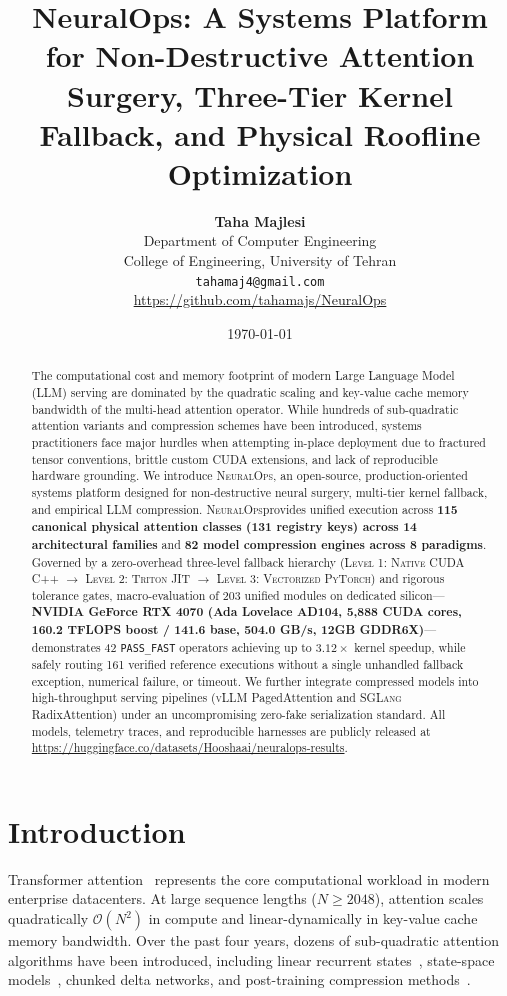 \documentclass{article}
\title{\textbf{NeuralOps: A Systems Platform for Non-Destructive Attention Surgery, Three-Tier Kernel Fallback, and Physical Roofline Optimization}}
\author{
  \textbf{Taha Majlesi} \\
  Department of Computer Engineering \\
  College of Engineering, University of Tehran \\
  \texttt{tahamaj4@gmail.com} \\
  \url{https://github.com/tahamajs/NeuralOps}
}
\date{\today}
\newcommand{\systemname}{\textsc{NeuralOps}}
\newcommand{\passfast}{\texttt{PASS\_FAST}}
\begin{document}
\maketitle

\begin{abstract}
The computational cost and memory footprint of modern Large Language Model (LLM) serving are dominated by the quadratic scaling and key-value cache memory bandwidth of the multi-head attention operator. While hundreds of sub-quadratic attention variants and compression schemes have been introduced, systems practitioners face major hurdles when attempting in-place deployment due to fractured tensor conventions, brittle custom CUDA extensions, and lack of reproducible hardware grounding. We introduce \systemname, an open-source, production-oriented systems platform designed for non-destructive neural surgery, multi-tier kernel fallback, and empirical LLM compression. \systemname provides unified execution across \textbf{115 canonical physical attention classes (131 registry keys) across 14 architectural families} and \textbf{82 model compression engines across 8 paradigms}. Governed by a zero-overhead three-level fallback hierarchy (\textsc{Level 1: Native CUDA C++} $\to$ \textsc{Level 2: Triton JIT} $\to$ \textsc{Level 3: Vectorized PyTorch}) and rigorous tolerance gates, macro-evaluation of 203 unified modules on dedicated silicon---\textbf{NVIDIA GeForce RTX 4070 (Ada Lovelace AD104, 5,888 CUDA cores, 160.2 TFLOPS boost / 141.6 base, 504.0 GB/s, 12GB GDDR6X)}---demonstrates 42 \passfast{} operators achieving up to $3.12\times$ kernel speedup, while safely routing 161 verified reference executions without a single unhandled fallback exception, numerical failure, or timeout. We further integrate compressed models into high-throughput serving pipelines (\textsc{vLLM} PagedAttention and \textsc{SGLang} RadixAttention) under an uncompromising zero-fake serialization standard. All models, telemetry traces, and reproducible harnesses are publicly released at \url{https://huggingface.co/datasets/Hooshaai/neuralops-results}.
\end{abstract}

\section{Introduction}
\label{sec:introduction}
Transformer attention~\citep{vaswani2017attention} represents the core computational workload in modern enterprise datacenters. At large sequence lengths ($N \ge 2048$), attention scales quadratically $\mathcal{O}(N^2)$ in compute and linear-dynamically in key-value cache memory bandwidth. Over the past four years, dozens of sub-quadratic attention algorithms have been introduced, including linear recurrent states~\citep{katharopoulos2020transformers,schlag2021deltanet}, state-space models~\citep{gu2023mamba}, chunked delta networks, and post-training compression methods~\citep{frantar2023gptq,frantar2023sparsegpt}.
\end{document}
